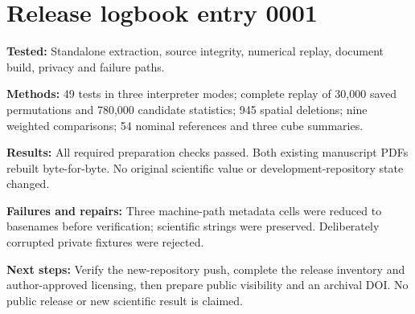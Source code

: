 \section*{Release logbook entry 0001}
\textbf{Tested:} Standalone extraction, source integrity, numerical replay, document build, privacy and failure paths.

\textbf{Methods:} 49 tests in three interpreter modes; complete replay of 30,000 saved permutations and 780,000 candidate statistics; 945 spatial deletions; nine weighted comparisons; 54 nominal references and three cube summaries.

\textbf{Results:} All required preparation checks passed. Both existing manuscript PDFs rebuilt byte-for-byte. No original scientific value or development-repository state changed.

\textbf{Failures and repairs:} Three machine-path metadata cells were reduced to basenames before verification; scientific strings were preserved. Deliberately corrupted private fixtures were rejected.

\textbf{Next steps:} Verify the new-repository push, complete the release inventory and author-approved licensing, then prepare public visibility and an archival DOI. No public release or new scientific result is claimed.
